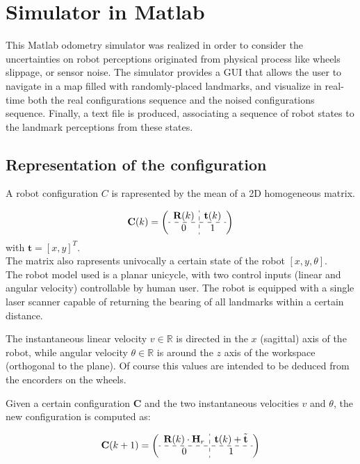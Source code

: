 \section{Simulator in Matlab}\label{sec:matlab_simulator}

This Matlab odometry simulator was realized in order to consider the uncertainties on robot perceptions originated from physical process like wheels slippage,
or sensor noise.
The simulator provides a GUI that allows the user to navigate in a map filled with randomly-placed landmarks, and visualize in real-time both the real configurations sequence 
and the noised configurations sequence.
Finally, a text file is produced, associating a sequence of robot states to the landmark perceptions from these states.

\subsection{Representation of the configuration}
A robot configuration $C$ is rapresented by the mean of a 2D homogeneous matrix.

\[ 
\textbf{C}(k) = 
\left( \begin{array}{c:c}
  \textbf{R}(k)  & \textbf{t}(k) \\ \hdashline
  0 & 1  \\
\end{array} \right)
\]
with $\textbf{t} = [x,y]^T$.\\

The matrix also rapresents univocally a certain state of the robot $[x,y,\theta]$.
\\
The robot model used is a planar unicycle, with two control inputs (linear and angular velocity) controllable by human user.
The robot is equipped with a single laser scanner capable of returning the bearing of all landmarks within a certain distance.

The instantaneous linear velocity $v \in \mathbb{R}$ is directed in the $x$ (sagittal) axis of the robot, while angular velocity $\theta \in \mathbb{R}$ is
around the $z$ axis of the workspace (orthogonal to the plane). Of course this values are intended to be deduced from the encorders on the wheels.

Given a certain configuration $\textbf{C}$ and the two instantaneous velocities $v$ and $\theta$, the new configuration is computed as:

\[ 
\textbf{C}(k+1) = 
\left( \begin{array}{c:c}
  \textbf{R}(k) \cdot \textbf{H}_r & \textbf{t}(k) + \tilde{\textbf{t}} \\ \hdashline
  0 & 1  \\
\end{array} \right)
\]

